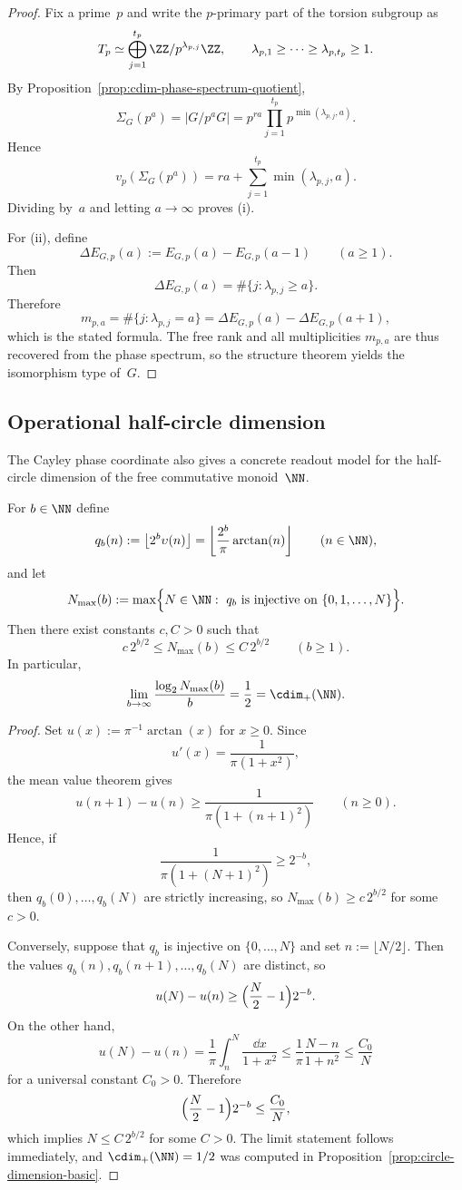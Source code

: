 \begin{proof}
Fix a prime~$p$ and write the $p$-primary part of the torsion subgroup as
\[
T_p\simeq \bigoplus_{j=1}^{t_p}\ZZ/p^{\lambda_{p,j}}\ZZ,
\qquad
\lambda_{p,1}\ge \cdots\ge \lambda_{p,t_p}\ge 1.
\]
By Proposition~\ref{prop:cdim-phase-spectrum-quotient},
\[
\Sigma_G(p^a)=|G/p^aG|
=p^{ra}\prod_{j=1}^{t_p}p^{\min(\lambda_{p,j},a)}.
\]
Hence
\[
v_p(\Sigma_G(p^a))=ra+\sum_{j=1}^{t_p}\min(\lambda_{p,j},a).
\]
Dividing by~$a$ and letting $a\to\infty$ proves (i).

For (ii), define
\[
\Delta E_{G,p}(a):=E_{G,p}(a)-E_{G,p}(a-1)
\qquad(a\ge 1).
\]
Then
\[
\Delta E_{G,p}(a)
=\#\{j:\lambda_{p,j}\ge a\}.
\]
Therefore
\[
m_{p,a}
=\#\{j:\lambda_{p,j}=a\}
=\Delta E_{G,p}(a)-\Delta E_{G,p}(a+1),
\]
which is the stated formula.  The free rank and all multiplicities
$m_{p,a}$ are thus recovered from the phase spectrum, so the structure
theorem yields the isomorphism type of~$G$.
\end{proof}

\subsection{Operational half-circle dimension}

The Cayley phase coordinate also gives a concrete readout model for the
half-circle dimension of the free commutative monoid~$\NN$.

\begin{theorem}%
\label{thm:cdim-operational-half-circle-dimension-N}
For $b\in\NN$ define
\[
q_b(n):=\left\lfloor 2^b\upsilon(n)\right\rfloor
=\left\lfloor \frac{2^b}{\pi}\arctan(n)\right\rfloor
\qquad(n\in\NN),
\]
and let
\[
N_{\max}(b):=
\max\Bigl\{N\in\NN:\ q_b\ \text{is injective on}\ \{0,1,\dots,N\}\Bigr\}.
\]
Then there exist constants $c,C>0$ such that
\[
c\,2^{b/2}\le N_{\max}(b)\le C\,2^{b/2}
\qquad(b\ge 1).
\]
In particular,
\[
\lim_{b\to\infty}\frac{\log_2 N_{\max}(b)}{b}=\frac{1}{2}
=\cdim_+(\NN).
\]
\end{theorem}

\begin{proof}
Set $u(x):=\pi^{-1}\arctan(x)$ for $x\ge 0$.  Since
\[
u'(x)=\frac{1}{\pi(1+x^2)},
\]
the mean value theorem gives
\[
u(n+1)-u(n)\ge \frac{1}{\pi(1+(n+1)^2)}
\qquad(n\ge 0).
\]
Hence, if
\[
\frac{1}{\pi(1+(N+1)^2)}\ge 2^{-b},
\]
then $q_b(0),\dots,q_b(N)$ are strictly increasing, so
$N_{\max}(b)\ge c\,2^{b/2}$ for some $c>0$.

Conversely, suppose that $q_b$ is injective on $\{0,\dots,N\}$ and set
$n:=\lfloor N/2\rfloor$.  Then the values
$q_b(n),q_b(n+1),\dots,q_b(N)$ are distinct, so
\[
u(N)-u(n)\ge \Bigl(\frac{N}{2}-1\Bigr)2^{-b}.
\]
On the other hand,
\[
u(N)-u(n)
=\frac{1}{\pi}\int_n^N\frac{\dd x}{1+x^2}
\le \frac{1}{\pi}\frac{N-n}{1+n^2}
\le \frac{C_0}{N}
\]
for a universal constant $C_0>0$.  Therefore
\[
\Bigl(\frac{N}{2}-1\Bigr)2^{-b}\le \frac{C_0}{N},
\]
which implies $N\le C\,2^{b/2}$ for some $C>0$.
The limit statement follows immediately, and
$\cdim_+(\NN)=1/2$ was computed in
Proposition~\ref{prop:circle-dimension-basic}.
\end{proof}

